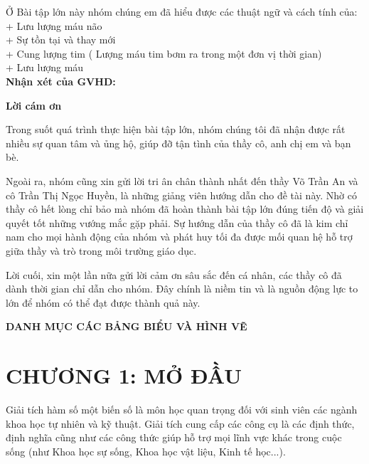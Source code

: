 \documentclass[12pt,a4paper]{article}
\begin{document}
Ở Bài tập lớn này nhóm chúng em đã hiểu được các thuật ngữ và cách tính của:\\
+ Lưu lượng máu não\\
+ Sự tồn tại và thay mới\\
+ Cung lượng tim ( Lượng máu tim bơm ra trong một đơn vị thời gian)\\
+ Lưu lượng máu \\


\textbf{Nhận xét của GVHD:}

\newpage
\begin{center}
	\large\textbf{Lời cám ơn}
\end{center}

Trong suốt quá trình thực hiện bài tập lớn, nhóm chúng tôi đã nhận 
được rất nhiều sự quan tâm và ủng hộ, giúp đỡ tận tình của thầy cô, 
anh chị em và bạn bè.

\vspace{1em}

Ngoài ra, nhóm cũng xin gửi lời tri ân chân thành nhất đến thầy 
Võ Trần An và cô Trần Thị Ngọc Huyền, là những giảng viên hướng dẫn cho đề tài 
này. Nhờ có thầy cô hết lòng chỉ bảo mà nhóm đã hoàn thành bài tập lớn đúng 
tiến độ và giải quyết tốt những vướng mắc gặp phải. Sự hướng dẫn của thầy cô đã 
là kim chỉ nam cho mọi hành động của nhóm và phát huy tối đa được mối quan hệ 
hỗ trợ giữa thầy và trò trong môi trường giáo dục.

\vspace{1em}

Lời cuối, xin một lần nữa gửi lời cảm ơn sâu sắc đến cá nhân, 
các thầy cô đã dành thời gian chỉ dẫn cho nhóm. Đây chính là niềm tin 
và là nguồn động lực to lớn để nhóm có thể đạt được thành quả này.

\newpage
\begin{center}
	\tableofcontents
\end{center}

\newpage
\begin{center}
	\Large\textbf{DANH MỤC CÁC BẢNG BIỂU VÀ HÌNH VẼ}
\end{center}
\listoftables{}
\listoffigures{}

\newpage
{}
\section*{CHƯƠNG 1: MỞ ĐẦU}
Giải tích hàm số một biến số là môn học quan trọng đối với sinh viên các ngành khoa học tự nhiên và kỹ thuật.
Giải tích cung cấp các công cụ là các định thức, định nghĩa cũng như các công thức giúp hỗ trợ mọi lĩnh vực khác trong cuộc sống 
(như Khoa học sự sống, Khoa học vật liệu, Kinh tế học...).
\end{document}
